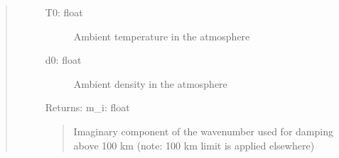 \documentclass[letterpaper,10pt,english]{sphinxmanual}
\begin{document}
\begin{fulllineitems}
\begin{quote}
\begin{description}
\begin{description}
\item[{}] \leavevmode
\item[{}] \leavevmode
\item[{}] \leavevmode
\item[{}] \leavevmode\begin{description}
\item[{T0: float}] \leavevmode
Ambient temperature in the atmosphere

\item[{d0: float}] \leavevmode
Ambient density in the atmosphere

\end{description}

Returns:
m\_i: float
\begin{quote}

Imaginary component of the wavenumber used for damping above 100 km (note: 100 km limit is applied elsewhere)
\end{quote}

\end{description}

\end{description}\end{quote}

\end{fulllineitems}

\end{document}
